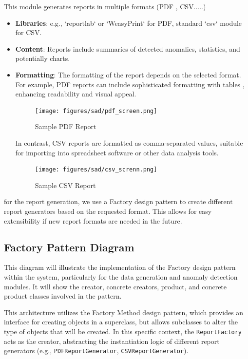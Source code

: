This module generates reports in multiple formats (PDF , CSV.....)
\begin{itemize}
    \item \textbf{Libraries}: e.g., `reportlab` or `WeasyPrint` for PDF, standard `csv` module for CSV.
    \item \textbf{Content}: Reports include summaries of detected anomalies, statistics, and potentially charts.
    \item \textbf{Formatting}: The formatting of the report depends on the selected format. For example, PDF reports can include sophisticated formatting with tables , enhancing readability and visual appeal. 

\begin{figure}[H]
    \centering
    \texttt{[image: figures/sad/pdf\_screen.png]}
    \caption{Sample PDF Report}
    \label{fig:pdf_report_screenshot}
\end{figure}

In contrast, CSV reports are formatted as comma-separated values, suitable for importing into spreadsheet software or other data analysis tools. 

\begin{figure}[H]
    \centering
    \texttt{[image: figures/sad/csv\_screnn.png]}
    \caption{Sample CSV Report}
    \label{fig:csv_report_screenshot}
\end{figure}
\end{itemize}

for the report generation, we use a Factory design pattern to create different report generators based on the requested format. This allows for easy extensibility if new report formats are needed in the future.
\subsection{Factory Pattern Diagram}
This diagram will illustrate the implementation of the Factory design pattern within the system, particularly for the data generation and anomaly detection modules. It will show the creator, concrete creators, product, and concrete product classes involved in the pattern.

This architecture utilizes the Factory Method design pattern, which provides an interface for creating objects in a superclass, but allows subclasses to alter the type of objects that will be created. In this specific context, the \texttt{ReportFactory} acts as the creator, abstracting the instantiation logic of different report generators (e.g., \texttt{PDFReportGenerator}, \texttt{CSVReportGenerator}).

